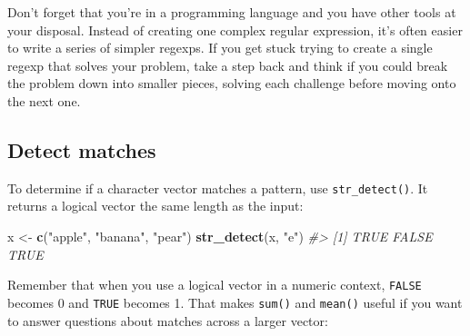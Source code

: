 \documentclass[]{book}
\newenvironment{Shaded}{\begin{snugshade}}{\end{snugshade}}
\newcommand{\CommentTok}[1]{\textcolor[rgb]{0.56,0.35,0.01}{\textit{#1}}}
\newcommand{\DecValTok}[1]{\textcolor[rgb]{0.00,0.00,0.81}{#1}}
\newcommand{\KeywordTok}[1]{\textcolor[rgb]{0.13,0.29,0.53}{\textbf{#1}}}
\newcommand{\NormalTok}[1]{#1}
\newcommand{\OperatorTok}[1]{\textcolor[rgb]{0.81,0.36,0.00}{\textbf{#1}}}
\newcommand{\StringTok}[1]{\textcolor[rgb]{0.31,0.60,0.02}{#1}}
\begin{document}
Don't forget that you're in a programming language and you have other tools at your disposal. Instead of creating one complex regular expression, it's often easier to write a series of simpler regexps. If you get stuck trying to create a single regexp that solves your problem, take a step back and think if you could break the problem down into smaller pieces, solving each challenge before moving onto the next one.

\hypertarget{detect-matches}{%
\subsection{Detect matches}\label{detect-matches}}

To determine if a character vector matches a pattern, use \texttt{str\_detect()}. It returns a logical vector the same length as the input:

\begin{Shaded}
\begin{Highlighting}[]
\NormalTok{x <-}\StringTok{ }\KeywordTok{c}\NormalTok{(}\StringTok{"apple"}\NormalTok{, }\StringTok{"banana"}\NormalTok{, }\StringTok{"pear"}\NormalTok{)}
\KeywordTok{str_detect}\NormalTok{(x, }\StringTok{"e"}\NormalTok{)}
\CommentTok{#> [1]  TRUE FALSE  TRUE}
\end{Highlighting}
\end{Shaded}

Remember that when you use a logical vector in a numeric context, \texttt{FALSE} becomes 0 and \texttt{TRUE} becomes 1. That makes \texttt{sum()} and \texttt{mean()} useful if you want to answer questions about matches across a larger vector:

\begin{Shaded}
\end{Shaded}
\end{document}
